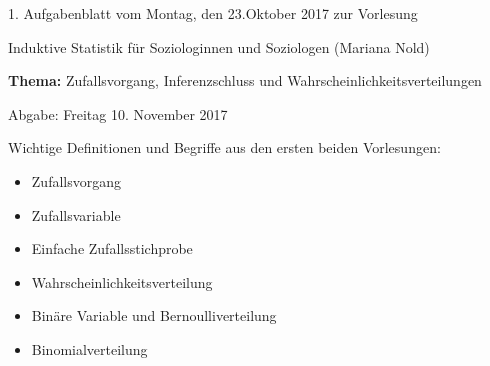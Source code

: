 \documentclass[11pt]{article}
\newcommand{\VORLESUNG}{Induktive Statistik für Soziologinnen und Soziologen}
\newcommand{\STAFF}{Mariana Nold}
\newcommand{\ASSIGNMENT}{1}
\newcommand{\HANDOUT}{Montag, den 23.Oktober   2017}
\newcommand{\DELIVER}{Freitag 10. November 2017}
\newcommand{\PRACTICAL}[1]{\marginpar{\tiny {\bf Aufgabe \\ abgeben!} #1}}
\newcommand{\titel}{Zufallsvorgang, Inferenzschluss und Wahrscheinlichkeitsverteilungen}
\begin{document}

\begin{center}
\ASSIGNMENT{}. Aufgabenblatt vom \HANDOUT{} zur Vorlesung 
\vspace*{0.5cm}

{\Large \VORLESUNG{}}
(\STAFF{}) 


\vspace*{0.5cm}
{\textbf{Thema:} \titel{}\\}
\vspace*{0.2cm}

{\small Abgabe: \DELIVER{}}
\vspace*{1cm}
\end{center}

Wichtige Definitionen und Begriffe aus den ersten beiden Vorlesungen:
\begin{itemize}
\item{Zufallsvorgang}
\item{Zufallsvariable}
\item{Einfache Zufallsstichprobe}
\item{Wahrscheinlichkeitsverteilung}
\item{Binäre Variable und  Bernoulliverteilung}
\item{Binomialverteilung}
\end{itemize}
\end{document}
